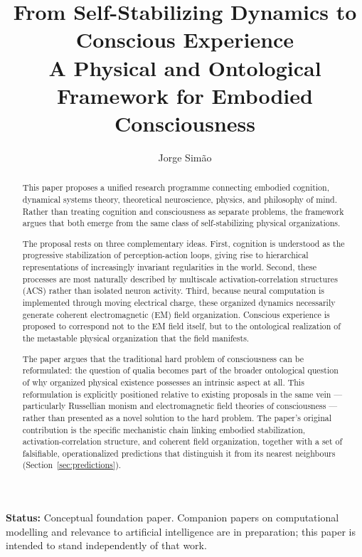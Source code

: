 \documentclass[11pt]{article}
\title{\textbf{From Self-Stabilizing Dynamics to Conscious Experience}\\[0.3em]
\large A Physical and Ontological Framework for Embodied Consciousness}
\author{Jorge Sim\~ao}
\date{}
\begin{document}
\maketitle

\noindent\textbf{Status:} Conceptual foundation paper. Companion papers on computational modelling and relevance to artificial intelligence are in preparation; this paper is intended to stand independently of that work.

\begin{abstract}
\noindent This paper proposes a unified research programme connecting embodied cognition, dynamical systems theory, theoretical neuroscience, physics, and philosophy of mind. Rather than treating cognition and consciousness as separate problems, the framework argues that both emerge from the same class of self-stabilizing physical organizations.

The proposal rests on three complementary ideas. First, cognition is understood as the progressive stabilization of perception-action loops, giving rise to hierarchical representations of increasingly invariant regularities in the world. Second, these processes are most naturally described by multiscale activation-correlation structures (ACS) rather than isolated neuron activity. Third, because neural computation is implemented through moving electrical charge, these organized dynamics necessarily generate coherent electromagnetic (EM) field organization. Conscious experience is proposed to correspond not to the EM field itself, but to the ontological realization of the metastable physical organization that the field manifests.

The paper argues that the traditional hard problem of consciousness can be reformulated: the question of qualia becomes part of the broader ontological question of why organized physical existence possesses an intrinsic aspect at all. This reformulation is explicitly positioned relative to existing proposals in the same vein --- particularly Russellian monism \citep*{strawson2006} and electromagnetic field theories of consciousness \citep*{mcfadden2002a,mcfadden2020} --- rather than presented as a novel solution to the hard problem. The paper's original contribution is the specific mechanistic chain linking embodied stabilization, activation-correlation structure, and coherent field organization, together with a set of falsifiable, operationalized predictions that distinguish it from its nearest neighbours (Section~\ref{sec:predictions}).
\end{abstract}
\end{document}
